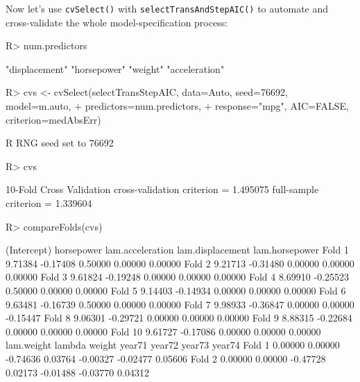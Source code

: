 \documentclass[
]{jss}
\begin{document}
Now let's use \texttt{cvSelect()} with \texttt{selectTransAndStepAIC()}
to automate and cross-validate the whole model-specification process:

\begin{CodeChunk}
\begin{CodeInput}
R> num.predictors
\end{CodeInput}
\begin{CodeOutput}
[1] "displacement" "horsepower"   "weight"       "acceleration"
\end{CodeOutput}
\begin{CodeInput}
R> cvs <- cvSelect(selectTransStepAIC, data=Auto, seed=76692, model=m.auto,
+                 predictors=num.predictors,
+                 response="mpg", AIC=FALSE, criterion=medAbsErr)
\end{CodeInput}
\begin{CodeOutput}
R RNG seed set to 76692
\end{CodeOutput}
\begin{CodeInput}
R> cvs
\end{CodeInput}
\begin{CodeOutput}
10-Fold Cross Validation
cross-validation criterion = 1.495075
full-sample criterion = 1.339604 
\end{CodeOutput}
\begin{CodeInput}
R> compareFolds(cvs)
\end{CodeInput}
\begin{CodeOutput}
        (Intercept) horsepower lam.acceleration lam.displacement lam.horsepower
Fold 1      9.71384   -0.17408          0.50000          0.00000        0.00000
Fold 2      9.21713   -0.31480          0.00000          0.00000        0.00000
Fold 3      9.61824   -0.19248          0.00000          0.00000        0.00000
Fold 4      8.69910   -0.25523          0.50000          0.00000        0.00000
Fold 5      9.14403   -0.14934          0.00000          0.00000        0.00000
Fold 6      9.63481   -0.16739          0.50000          0.00000        0.00000
Fold 7      9.98933   -0.36847          0.00000          0.00000       -0.15447
Fold 8      9.06301   -0.29721          0.00000          0.00000        0.00000
Fold 9      8.88315   -0.22684          0.00000          0.00000        0.00000
Fold 10     9.61727   -0.17086          0.00000          0.00000        0.00000
        lam.weight   lambda   weight   year71   year72   year73   year74
Fold 1     0.00000  0.00000 -0.74636  0.03764 -0.00327 -0.02477  0.05606
Fold 2     0.00000  0.00000 -0.47728  0.02173 -0.01488 -0.03770  0.04312

\end{CodeOutput}
\end{CodeChunk}
\end{document}

